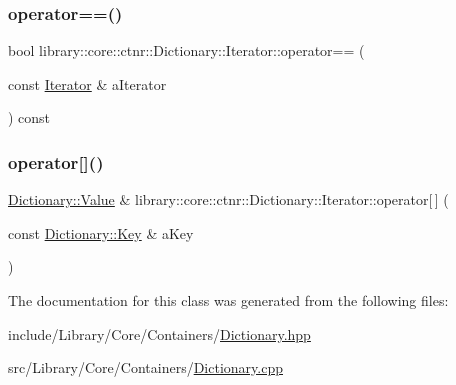 \subsubsection{\texorpdfstring{operator==()}{operator==()}}
{\footnotesize\ttfamily bool library\+::core\+::ctnr\+::\+Dictionary\+::\+Iterator\+::operator== (\begin{DoxyParamCaption}\item[{const \hyperlink{classlibrary_1_1core_1_1ctnr_1_1_dictionary_1_1_iterator}{Iterator} \&}]{a\+Iterator }\end{DoxyParamCaption}) const}

\mbox{\label{classlibrary_1_1core_1_1ctnr_1_1_dictionary_1_1_iterator_a74b081965e71a2169245e43e7a4aff98}} 
\subsubsection{\texorpdfstring{operator[]()}{operator[]()}}
{\footnotesize\ttfamily \hyperlink{classlibrary_1_1core_1_1ctnr_1_1_dictionary_a3baf6692694e4fc27cb399ac083c88ea}{Dictionary\+::\+Value} \& library\+::core\+::ctnr\+::\+Dictionary\+::\+Iterator\+::operator\mbox{[}$\,$\mbox{]} (\begin{DoxyParamCaption}\item[{const \hyperlink{classlibrary_1_1core_1_1ctnr_1_1_dictionary_a987cae687cce70d81a2a483c5e05e842}{Dictionary\+::\+Key} \&}]{a\+Key }\end{DoxyParamCaption})}



The documentation for this class was generated from the following files\+:\begin{DoxyCompactItemize}
\item 
include/\+Library/\+Core/\+Containers/\hyperlink{_dictionary_8hpp}{Dictionary.\+hpp}\item 
src/\+Library/\+Core/\+Containers/\hyperlink{_dictionary_8cpp}{Dictionary.\+cpp}\end{DoxyCompactItemize}
